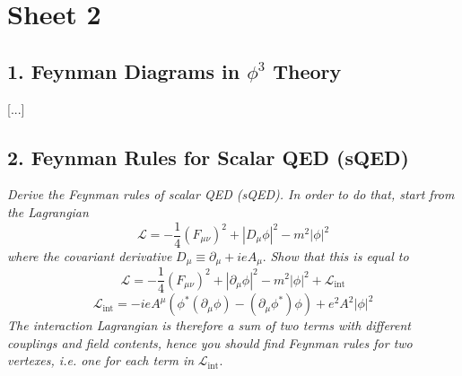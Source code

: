 \section*{Sheet 2}

\subsection{1. Feynman Diagrams in $\phi^3$ Theory}

[...]


\subsection*{2. Feynman Rules for Scalar QED (sQED)}

\begin{center}
    \textit{Derive the Feynman rules of scalar QED (sQED). In order to do that, start from the Lagrangian}
    \[
        \mathcal{L} = -\frac{1}{4}(F_{\mu\nu})^2 + |D_\mu\phi|^2 - m^2|\phi|^2
    \]
    \textit{where the covariant derivative } $D_\mu \equiv \partial_\mu + i e A_\mu$. \textit{Show that this is equal to}
    \[
        \mathcal{L} = -\frac{1}{4}(F_{\mu\nu})^2 + |\partial_\mu\phi|^2 - m^2|\phi|^2 + \mathcal{L}_{\text{int}}
    \]
    \[
        \mathcal{L}_{\text{int}} = -ieA^\mu \left( \phi^*(\partial_\mu\phi) - (\partial_\mu\phi^*)\phi \right) + e^2 A^2 |\phi|^2
    \]
    \textit{The interaction Lagrangian is therefore a sum of two terms with different couplings and field contents, hence you should find Feynman rules for two vertexes, i.e. one for each term in} $\mathcal{L}_{\text{int}}$.
\end{center}

